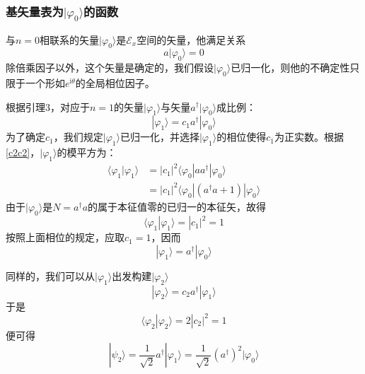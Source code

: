 \documentclass[]{article}
\begin{document}
\subsubsection{基矢量表为$|\varphi_0\rangle$的函数}
与$n=0$相联系的矢量$|\varphi_0\rangle$是$\mathscr{E}_x$空间的矢量，他满足关系
\begin{equation}
	a|\varphi_0\rangle=0
\end{equation}
除倍乘因子以外，这个矢量是确定的，我们假设$|\varphi_0\rangle$已归一化，则他的不确定性只限于一个形如$e^{\mathrm{i}\theta}$的全局相位因子。\par 
根据引理3，对应于$n=1$的矢量$|\varphi_1\rangle$与矢量$a^\dagger|\varphi_0\rangle$成比例：
\begin{equation}
	|\varphi_1\rangle=c_1a^\dagger|\varphi_0\rangle
	\label{c2c2}
\end{equation}
为了确定$c_1$，我们规定$|\varphi_1\rangle$已归一化，并选择$|\varphi_1\rangle$的相位使得$c_1$为正实数。根据\eqref{c2c2}，$|\varphi_1\rangle$的模平方为：
\begin{align}
	\langle\varphi_1|\varphi_1\rangle&=|c_1|^2\langle\varphi_0|aa^\dagger|\varphi_0\rangle\nonumber\\
									 &=|c_1|^2\langle\varphi_0|(a^\dagger a+1)|\varphi_0\rangle
\end{align}
由于$|\varphi_0\rangle$是$N=a^\dagger a$的属于本征值零的已归一的本征矢，故得
\begin{equation}
	\langle\varphi_1|\varphi_1\rangle=|c_1|^2=1
\end{equation}
按照上面相位的规定，应取$c_1=1$，因而
\begin{equation}
	|\varphi_1\rangle=a^\dagger|\varphi_0\rangle
\end{equation}

同样的，我们可以从$|\varphi_1\rangle$出发构建$|\varphi_2\rangle$
\begin{equation}
	|\varphi_2\rangle=c_2a^\dagger|\varphi_1\rangle
\end{equation}
于是
\begin{equation}
	\langle\varphi_2|\varphi_2\rangle=2|c_2|^2=1
\end{equation}
便可得
\begin{equation}
	|\psi_2\rangle=\dfrac{1}{\sqrt{2}}a^\dagger|\varphi_1\rangle=\dfrac{1}{\sqrt{2}}(a^\dagger)^2|\varphi_0\rangle
\end{equation}
\end{document}
